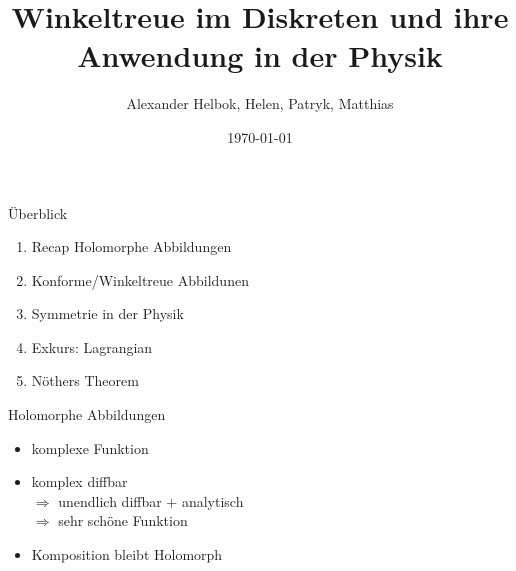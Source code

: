 \documentclass[10pt]{beamer}
\title{Winkeltreue im
	Diskreten und ihre Anwendung in der Physik}
\author{Alexander Helbok, Helen, Patryk, Matthias}
\date{\today}
\begin{document}
	
	\maketitle
	\begin{frame}[fragile]{Überblick}
		\begin{enumerate}
			\item Recap Holomorphe Abbildungen
			\item Konforme/Winkeltreue Abbildunen 
			\item Symmetrie in der Physik 
			\item Exkurs: Lagrangian 
			\item Nöthers Theorem
		\end{enumerate}
	\end{frame}

	\begin{frame}{Holomorphe Abbildungen}
		\vspace{1cm}\begin{itemize}[label={--}]
			\item komplexe Funktion
			\item komplex diffbar \\
			\( \Rightarrow \) unendlich diffbar + analytisch \\
			\( \Rightarrow \) sehr schöne Funktion
			\item Komposition bleibt Holomorph 
		\end{itemize}
		\hspace{6.25cm}\begin{minipage}{0.4\textwidth}
			\vspace{-3.5cm}\begin{figure}[h]
			\end{figure}
		\end{minipage}
	\end{frame}
\end{document}
